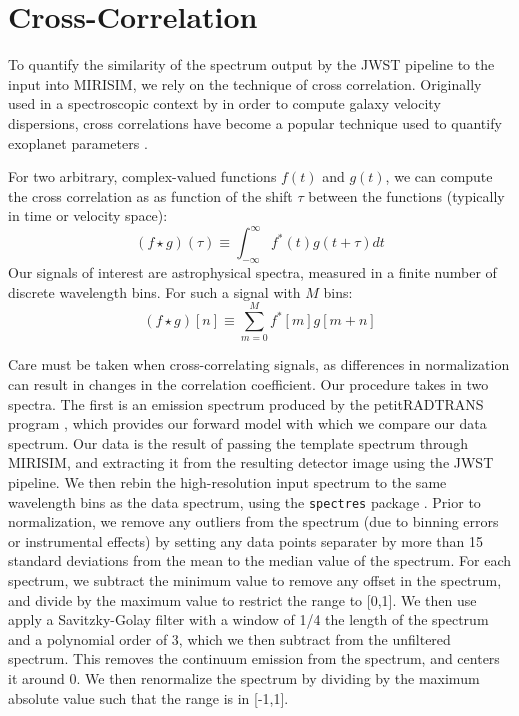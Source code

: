 \section{Cross-Correlation}\label{sec:cc}
To quantify the similarity of the spectrum output by the JWST pipeline to the input into MIRISIM, we rely on the technique of cross correlation.
Originally used in a spectroscopic context by \parencite{Simkin1974} in order to compute galaxy velocity dispersions, cross correlations have become a popular technique used to quantify exoplanet parameters \parencite{Snellen2014}.

For two arbitrary, complex-valued functions $f(t)$ and $g(t)$, we can compute the cross correlation as as function of the shift $\tau$ between the functions (typically in time or velocity space):
\begin{equation}\label{eqn:crosscorr}
\left(f \star g\right)(\tau) \equiv \int_{-\infty}^{\infty}f^{*}(t)g(t + \tau)dt
\end{equation}
Our signals of interest are astrophysical spectra, measured in a finite number of discrete wavelength bins. For such a signal with $M$ bins:
\begin{equation}\label{eqn:discretecorr}
\left(f \star g\right)[n] \equiv \sum_{m=0}^{M}f^{*}[m]g[m + n]
\end{equation}

Care must be taken when cross-correlating signals, as differences in normalization can result in changes in the correlation coefficient. 
Our procedure takes in two spectra. 
The first is an emission spectrum produced by the petitRADTRANS program \parencite{Molliere2019}, which provides our forward model with which we compare our data spectrum.
Our data is the result of passing the template spectrum through MIRISIM, and extracting it from the resulting detector image using the JWST pipeline.
We then rebin the high-resolution input spectrum to the same wavelength bins as the data spectrum, using the \verb|spectres| package \parencite{Carnall2017}.
Prior to normalization, we remove any outliers from the spectrum (due to binning errors or instrumental effects) by setting any data points separater by more than 15 standard deviations from the mean to the median value of the spectrum.
For each spectrum, we subtract the minimum value to remove any offset in the spectrum, and divide by the maximum value to restrict the range to [0,1]. 
We then use apply a Savitzky-Golay filter with a window of 1/4 the length of the spectrum and a polynomial order of 3, which we then subtract from the unfiltered spectrum. 
This removes the continuum emission from the spectrum, and centers it around 0.
We then renormalize the spectrum by dividing by the maximum absolute value such that the range is in [-1,1]. 

